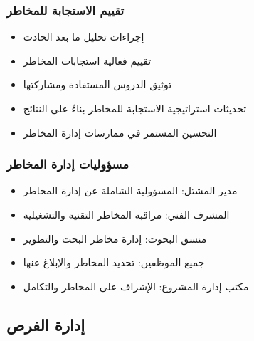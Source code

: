 \subsubsection{تقييم الاستجابة للمخاطر}
\begin{itemize}
    \item إجراءات تحليل ما بعد الحادث
    \item تقييم فعالية استجابات المخاطر
    \item توثيق الدروس المستفادة ومشاركتها
    \item تحديثات استراتيجية الاستجابة للمخاطر بناءً على النتائج
    \item التحسين المستمر في ممارسات إدارة المخاطر
\end{itemize}

\subsubsection{مسؤوليات إدارة المخاطر}
\begin{itemize}
    \item مدير المشتل: المسؤولية الشاملة عن إدارة المخاطر
    \item المشرف الفني: مراقبة المخاطر التقنية والتشغيلية
    \item منسق البحوث: إدارة مخاطر البحث والتطوير
    \item جميع الموظفين: تحديد المخاطر والإبلاغ عنها
    \item مكتب إدارة المشروع: الإشراف على المخاطر والتكامل
\end{itemize}

\subsection{إدارة الفرص}

